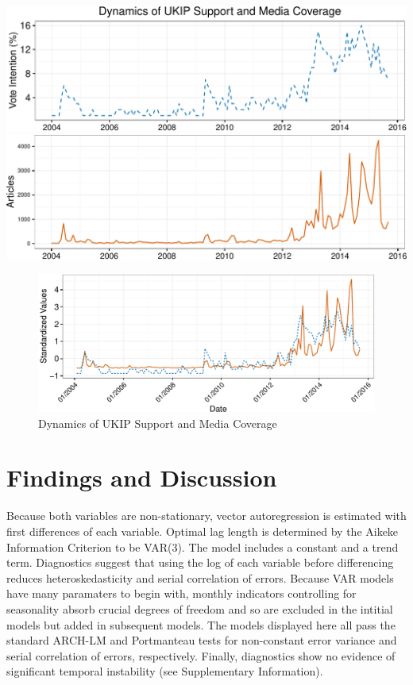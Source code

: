 \documentclass[12pt,article]{article}
\begin{document}
\includegraphics{ukip_media_files/figure-latex/unnamed-chunk-1-1.pdf}
\includegraphics{ukip_media_files/figure-latex/unnamed-chunk-1-2.pdf}

\begin{figure}[htbp]
\centering
\includegraphics{ukip_media_files/figure-latex/unnamed-chunk-2-1.pdf}
\caption{Dynamics of UKIP Support and Media Coverage}
\end{figure}

\section{Findings and Discussion}\label{findings-and-discussion}

Because both variables are non-stationary, vector autoregression is
estimated with first differences of each variable. Optimal lag length is
determined by the Aikeke Information Criterion to be VAR(3). The model
includes a constant and a trend term. Diagnostics suggest that using the
log of each variable before differencing reduces heteroskedasticity and
serial correlation of errors. Because VAR models have many paramaters to
begin with, monthly indicators controlling for seasonality absorb
crucial degrees of freedom and so are excluded in the intitial models
but added in subsequent models. The models displayed here all pass the
standard ARCH-LM and Portmanteau tests for non-constant error variance
and serial correlation of errors, respectively. Finally, diagnostics
show no evidence of significant temporal instability (see Supplementary
Information).
\end{document}
